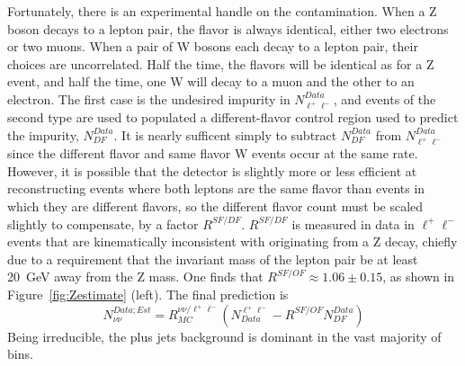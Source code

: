     Fortunately, there is an experimental handle on the contamination.
    When a Z boson decays to a lepton pair, the flavor is always identical, either two electrons or two muons.
    When a pair of W bosons each decay to a lepton pair, their choices are uncorrelated.
    Half the time, the flavors will be identical as for a Z event, and half the time, one W will decay to a muon and the other to an electron.
    The first case is the undesired impurity in $N_{\ell^+\ell^-}^{Data}$, and events of the second type are used to populated a different-flavor control region used to predict the impurity, $N_{DF}^{Data}$.
    It is nearly sufficent simply to subtract $N_{DF}^{Data}$ from $N_{\ell^+\ell^-}^{Data}$ since the different flavor and same flavor W events occur at the same rate.
    However, it is possible that the detector is slightly more or less efficient at reconstructing events where both leptons are the same flavor than events in which they are different flavors, so the different flavor count must be scaled slightly to compensate, by a factor $R^{SF/DF}$.
    $R^{SF/DF}$ is measured in data in $\ell^+\ell^-$ events that are kinematically inconsistent with originating from a Z decay, chiefly due to a requirement that the invariant mass of the lepton pair be at least 20~GeV away from the Z mass.
    One finds that $R^{SF/OF} \approx 1.06 \pm 0.15$, as shown in Figure~\ref{fig:Zestimate} (left).
    The final prediction is
    \begin{equation}
      N_{\nu\nu}^{Data;Est} = R_{MC}^{\nu\nu/\ell^+\ell^-}(N_{Data}^{\ell^+\ell^-}-R^{SF/OF}N_{DF}^{Data})
    \end{equation}
    Being irreducible, the \znunu plus jets background is dominant in the vast majority of bins.


